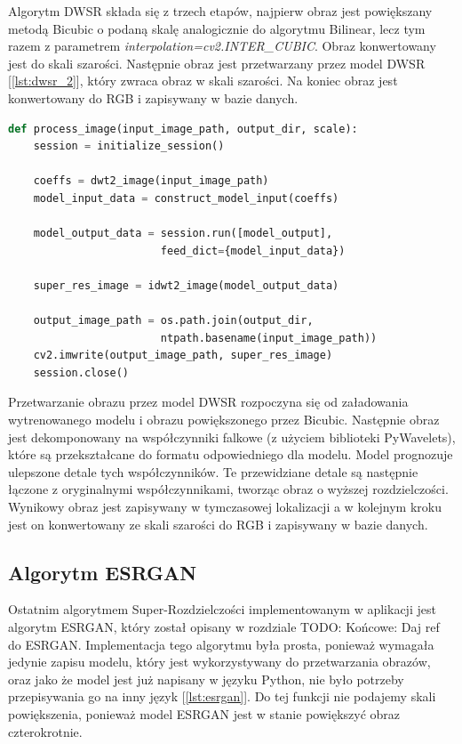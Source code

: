 Algorytm DWSR składa się z trzech etapów, najpierw obraz jest powiększany metodą Bicubic o podaną skalę analogicznie do algorytmu Bilinear, lecz tym razem z parametrem \textit{interpolation=cv2.INTER\_CUBIC}. Obraz konwertowany jest do skali szarości. Następnie obraz jest przetwarzany przez model DWSR [\ref{lst:dwsr_2}], który zwraca obraz w skali szarości. Na koniec obraz jest konwertowany do RGB i zapisywany w bazie danych.


\begin{lstlisting}[language=Python, caption=Przetwarzanie przez model DWSR., label={lst:dwsr_2}]    
def process_image(input_image_path, output_dir, scale):
    session = initialize_session()

    coeffs = dwt2_image(input_image_path)
    model_input_data = construct_model_input(coeffs)

    model_output_data = session.run([model_output], 
                        feed_dict={model_input_data})
    
    super_res_image = idwt2_image(model_output_data)

    output_image_path = os.path.join(output_dir, 
                        ntpath.basename(input_image_path))
    cv2.imwrite(output_image_path, super_res_image)        
    session.close()

\end{lstlisting}

Przetwarzanie obrazu przez model DWSR rozpoczyna się od załadowania wytrenowanego modelu i obrazu powiększonego przez Bicubic. Następnie obraz jest dekomponowany na współczynniki falkowe (z użyciem biblioteki PyWavelets), które są przekształcane do formatu odpowiedniego dla modelu. Model prognozuje ulepszone detale tych współczynników. 
Te przewidziane detale są następnie łączone z oryginalnymi współczynnikami, tworząc obraz o wyższej rozdzielczości. Wynikowy obraz jest zapisywany w tymczasowej lokalizacji a w kolejnym kroku jest on konwertowany ze skali szarości do RGB i zapisywany w bazie danych.


\subsection*{Algorytm ESRGAN}

Ostatnim algorytmem Super-Rozdzielczości implementowanym w aplikacji jest algorytm ESRGAN, który został opisany w rozdziale 
TODO: Końcowe: Daj ref do ESRGAN.
Implementacja tego algorytmu była prosta, ponieważ wymagała jedynie zapisu modelu, który jest wykorzystywany do przetwarzania obrazów, oraz jako że model jest już napisany w języku Python, nie było potrzeby przepisywania go na inny język [\ref{lst:esrgan}]. Do tej funkcji nie podajemy skali powiększenia, ponieważ model ESRGAN jest w stanie powiększyć obraz czterokrotnie.

